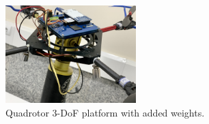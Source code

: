 \documentclass[3p]{elsarticle}
\begin{document}
\begin{figure}[H]
	\centering
	\includegraphics[width=0.45\textwidth]{../Figure/implementation/weight/Quad_with_weight.jpg}
	\caption{Quadrotor 3-DoF platform with added weights.} %
	\label{fig:quadrotor_with_weight}
	\centering
	\hfill

\end{figure}
\end{document}
